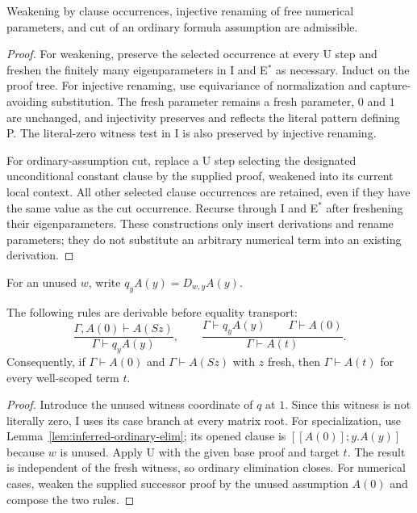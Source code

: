 \begin{lemma}
\label{lem:inferred-structural}
Weakening by clause occurrences, injective renaming of free numerical
parameters, and cut of an ordinary formula assumption are admissible.
\end{lemma}
\begin{proof}
For weakening, preserve the selected occurrence at every U step and freshen
the finitely many eigenparameters in I and E$^*$ as necessary. Induct on
the proof tree. For injective renaming, use equivariance of normalization
and capture-avoiding substitution. The fresh parameter remains a fresh
parameter, $0$ and $1$ are unchanged, and injectivity preserves and reflects
the literal pattern defining P. The literal-zero witness test in I is also
preserved by injective renaming.

For ordinary-assumption cut, replace a U step selecting the designated
unconditional constant clause by the supplied proof, weakened into its
current local context. All other selected clause occurrences are retained,
even if they have the same value as the cut occurrence. Recurse through I
and E$^*$ after freshening their eigenparameters. These constructions only
insert derivations and rename parameters; they do not substitute an
arbitrary numerical term into an existing derivation.
\end{proof}

For an unused $w$, write $q_yA(y)=D_{w,y}A(y)$.
\begin{lemma}
\label{lem:inferred-cases}
The following rules are derivable before equality transport:
\[
 \frac{\Gamma,A(0)\vdash A(Sz)}{\Gamma\vdash q_yA(y)},
 \qquad
 \frac{\Gamma\vdash q_yA(y)\qquad\Gamma\vdash A(0)}
      {\Gamma\vdash A(t)}.
\]
Consequently, if $\Gamma\vdash A(0)$ and $\Gamma\vdash A(Sz)$ with $z$
fresh, then $\Gamma\vdash A(t)$ for every well-scoped term $t$.
\end{lemma}
\begin{proof}
Introduce the unused witness coordinate of $q$ at $1$. Since this witness
is not literally zero, I uses its case branch at every matrix root.
For specialization, use Lemma~\ref{lem:inferred-ordinary-elim}; its opened
clause is $[[A(0)];y.A(y)]$ because $w$ is unused. Apply U with the given
base proof and target $t$. The result is independent of the fresh witness,
so ordinary elimination closes. For numerical cases, weaken the supplied
successor proof by the unused assumption $A(0)$ and compose the two rules.
\end{proof}


